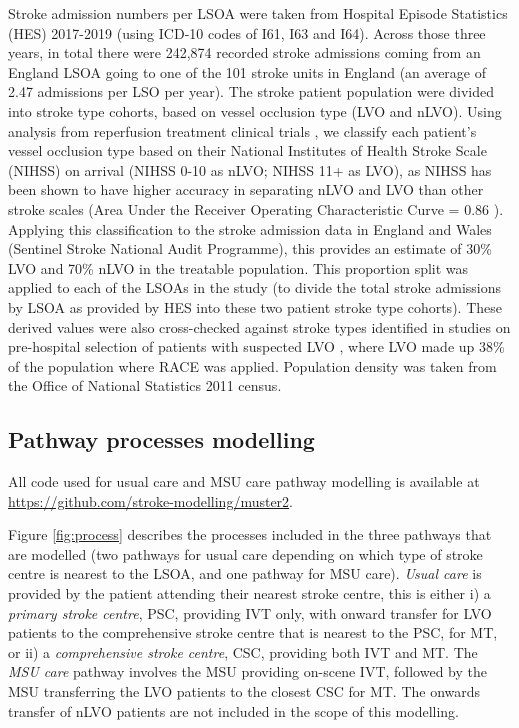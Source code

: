 Stroke admission numbers per LSOA were taken from Hospital Episode Statistics (HES) 2017-2019 (using ICD-10 codes of I61, I63 and I64). Across those three years, in total there were 242,874 recorded stroke admissions coming from an England LSOA going to one of the 101 stroke units in England (an average of 2.47 admissions per LSO per year). The stroke patient population were divided into stroke type cohorts, based on vessel occlusion type (LVO and nLVO). Using analysis from reperfusion treatment clinical trials \cite{lees_time_2010, emberson_effect_2014, goyal_endovascular_2016, fransen_time_2016}, we classify each patient's vessel occlusion type based on their National Institutes of Health Stroke Scale (NIHSS) on arrival (NIHSS 0-10 as nLVO; NIHSS 11+ as LVO), as NIHSS has been shown to have higher accuracy in separating nLVO and LVO than other stroke scales (Area Under the Receiver Operating Characteristic Curve = 0.86 \cite{duvekot_comparison_2021}). Applying this classification to the stroke admission data in England and Wales (Sentinel Stroke National Audit Programme), this provides an estimate of 30\% LVO and 70\% nLVO in the treatable population. This proportion split was applied to each of the LSOAs in the study (to divide the total stroke admissions by LSOA as provided by HES into these two patient stroke type cohorts). These derived values were also cross-checked against stroke types identified in studies on pre-hospital selection of patients with suspected LVO \cite{de_la_ossa_herrero_design_2013}, where LVO made up 38\% of the population where RACE was applied. Population density was taken from the Office of National Statistics 2011 census.

\subsection{Pathway processes modelling}

All code used for usual care and MSU care pathway modelling is available at \url{https://github.com/stroke-modelling/muster2}.

Figure \ref{fig:process} describes the processes included in the three pathways that are modelled (two pathways for usual care depending on which type of stroke centre is nearest to the LSOA, and one pathway for MSU care). \textit{Usual care} is provided by the patient attending their nearest stroke centre, this is either i) a \textit{primary stroke centre}, PSC, providing IVT only, with onward transfer for LVO patients to the comprehensive stroke centre that is nearest to the PSC, for MT, or ii) a \textit{comprehensive stroke centre}, CSC, providing both IVT and MT. The \textit{MSU care} pathway involves the MSU providing on-scene IVT, followed by the MSU transferring the LVO patients to the closest CSC for MT. The onwards transfer of nLVO patients are not included in the scope of this modelling.

